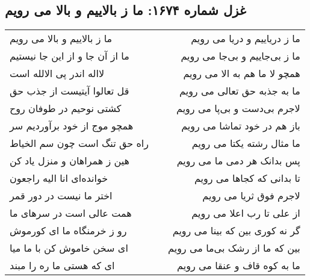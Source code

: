 \begin{center}
\section*{غزل شماره ۱۶۷۴: ما ز بالاییم و بالا می رویم}
\label{sec:1674}
\begin{longtable}{l p{0.5cm} r}
ما ز بالاییم و بالا می رویم
&&
ما ز دریاییم و دریا می رویم
\\
ما از آن جا و از این جا نیستیم
&&
ما ز بی‌جاییم و بی‌جا می رویم
\\
لااله اندر پی الالله است
&&
همچو لا ما هم به الا می رویم
\\
قل تعالوا آیتیست از جذب حق
&&
ما به جذبه حق تعالی می رویم
\\
کشتی نوحیم در طوفان روح
&&
لاجرم بی‌دست و بی‌پا می رویم
\\
همچو موج از خود برآوردیم سر
&&
باز هم در خود تماشا می رویم
\\
راه حق تنگ است چون سم الخیاط
&&
ما مثال رشته یکتا می رویم
\\
هین ز همراهان و منزل یاد کن
&&
پس بدانک هر دمی ما می رویم
\\
خوانده‌ای انا الیه راجعون
&&
تا بدانی که کجاها می رویم
\\
اختر ما نیست در دور قمر
&&
لاجرم فوق ثریا می رویم
\\
همت عالی است در سرهای ما
&&
از علی تا رب اعلا می رویم
\\
رو ز خرمنگاه ما ای کورموش
&&
گر نه کوری بین که بینا می رویم
\\
ای سخن خاموش کن با ما میا
&&
بین که ما از رشک بی‌ما می رویم
\\
ای که هستی ما ره را مبند
&&
ما به کوه قاف و عنقا می رویم
\\
\end{longtable}
\end{center}
